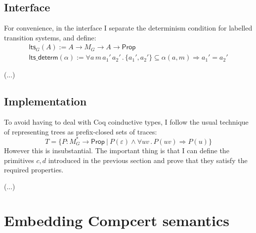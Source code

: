 \documentclass[11pt]{article}
\newcommand{\kw}[1]{{\mathsf{#1}}}
\begin{document}
\subsection{Interface}

For convenience,
in the interface I separate the determinism condition
for labelled transition systems, and define:
\begin{gather*}
  \kw{lts}_G(A) :=
    A \rightarrow M_G \rightarrow A \rightarrow \kw{Prop} \\
  \kw{lts\_determ}(\alpha) :=
    \forall a \, m \, a_1' \, a_2' \,.\,
      \{ a_1', a_2' \} \subseteq \alpha(a, m) \Rightarrow
      a_1' = a_2'
\end{gather*}

(...)

\subsection{Implementation}

To avoid having to deal with Coq coinductive types,
I follow the usual technique of representing trees as
prefix-closed sets of traces:
\[
  T = \{ P : M_G^* \rightarrow \kw{Prop} \ \vert\ 
    P(\varepsilon) \wedge
    \forall u v \,.\, P(u v) \Rightarrow P(u) \}
\]
However this is insubstantial.
The important thing is that I can define the primitives $c, d$
introduced in the previous section and prove that they
satisfy the required properties.

(...)


\section{Embedding Compcert semantics}
\end{document}
